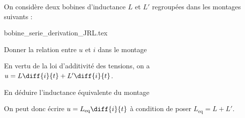 
\hauteurLargeurCadreReponse		{7mm}{4cm}
\typeEntrainement				{} %
\initialisationEntrainement


On considère deux bobines d'inductance $L$ et $L'$ regroupées dans les montages suivants : \minusMedskip
\begin{center}
{bobine_serie_derivation_JRL.tex}
\end{center}
\minusMedskip

\debutEntrainement


\begin{enonce}
Donner la relation entre $u$ et $i$ dans le montage \reponseA
\end{enonce}


\begin{corrige}
En vertu de la loi d'additivité des tensions, on a $u=L\diff{i}{t}+L'\diff{i}{t}$.
\end{corrige}




\begin{enonce}
En déduire l'inductance équivalente du montage \reponseA
\end{enonce}


\begin{corrige}
On peut donc écrire $u=L_\text{eq}\diff{i}{t}$ à condition de poser $L_\text{eq} = L+L'$.
\end{corrige}

